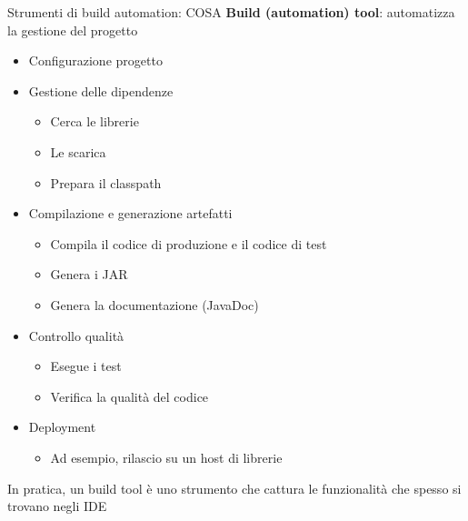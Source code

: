 \documentclass[xcolor=dvipsnames,presentation]{beamer}
\begin{document}
\begin{frame}{Strumenti di build automation: COSA}
    \textbf{Build (automation) tool}: automatizza la gestione del progetto
    \begin{itemize}
    	\item Configurazione progetto
        \item Gestione delle dipendenze
        \begin{itemize}
            \item Cerca le librerie
            \item Le scarica
            \item Prepara il classpath
        \end{itemize}
        \item Compilazione e generazione artefatti
        \begin{itemize}
            \item Compila il codice di produzione e il codice di test
            \item Genera i JAR
            \item Genera la documentazione (JavaDoc)
        \end{itemize}
        \item Controllo qualità
        \begin{itemize}
            \item Esegue i test
            \item Verifica la qualità del codice
        \end{itemize}
        \item Deployment
        	\begin{itemize}
        	\item Ad esempio, rilascio su un host di librerie
        	\end{itemize}
    \end{itemize}

In pratica, un build tool è uno strumento che cattura le funzionalità che spesso si trovano negli IDE   

\end{frame}
\end{document}
